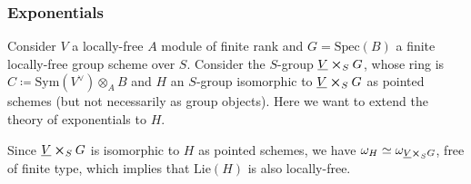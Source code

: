 \subsubsection{Exponentials}
Consider $V$ a locally-free $A$ module of finite rank
and $G = \mathrm{Spec}(B)$ a finite locally-free 
group scheme over $S$.
Consider the $S$-group $\underline{V} \cross_{ S } G$, whose ring is
$C \coloneqq \mathrm{Sym}(V^\vee) \otimes_A B$ and $H$ an $S$-group isomorphic
to $\underline{V} \cross_{ S } G$ as pointed schemes (but not necessarily
as group objects).
Here we want to extend the theory of exponentials to $H$.




\begin{rem}[]
	Since $\underline{V} \cross_{ S } G$ is isomorphic to $H$ as pointed
	schemes, we have $\omega_H \simeq \omega_{\underline{V} \cross_S G}$, free of finite type,
	which implies that $\mathrm{Lie}(H)$ is also locally-free.
\end{rem}


